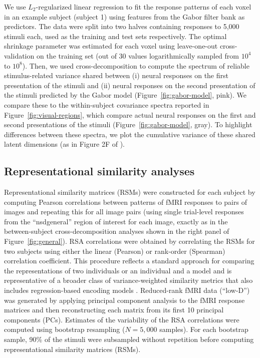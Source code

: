 \documentclass[10pt]{article}
\begin{document}
We use \(L_2\)-regularized linear regression to fit the response patterns of each voxel in an example subject (subject 1) using features from the Gabor filter bank as predictors. The data were split into two halves containing responses to 5,000 stimuli each, used as the training and test sets respectively. The optimal shrinkage parameter was estimated for each voxel using leave-one-out cross-validation on the training set (out of 30 values logarithmically sampled from \(10^4\) to \(10^8\)). Then, we used cross-decomposition to compute the spectrum of reliable stimulus-related variance shared between (i) neural responses on the first presentation of the stimuli and (ii) neural responses on the second presentation of the stimuli predicted by the Gabor model (Figure~\ref{fig:gabor-model}, pink). We compare these to the within-subject covariance spectra reported in Figure~\ref{fig:visual-regions}, which compare actual neural responses on the first and second presentations of the stimuli (Figure~\ref{fig:gabor-model}, gray). To highlight differences between these spectra, we plot the cumulative variance of these shared latent dimensions (as in Figure 2F of \textcite{Stringer2019}).

\subsection{Representational similarity analyses}\label{representational-similarity-analyses}

Representational similarity matrices (RSMs) were constructed for each subject by computing Pearson correlations between patterns of fMRI responses to pairs of images and repeating this for all image pairs (using single trial-level responses from the ``nsdgeneral'' region of interest for each image, exactly as in the between-subject cross-decomposition analyses shown in the right panel of Figure~\ref{fig:general}). RSA correlations were obtained by correlating the RSMs for two subjects using either the linear (Pearson) or rank-order (Spearman) correlation coefficient. This procedure reflects a standard approach for comparing the representations of two individuals or an individual and a model and is representative of a broader class of variance-weighted similarity metrics that also includes regression-based encoding models \autocite{Kriegeskorte2019,Kornblith2019}. Reduced-rank fMRI data (``low-D'') was generated by applying principal component analysis to the fMRI response matrices and then reconstructing each matrix from its first 10 principal components (PCs). Estimates of the variability of the RSA correlations were computed using bootstrap resampling (\(N = 5,000\) samples). For each bootstrap sample, 90\% of the stimuli were subsampled without repetition before computing representational similarity matrices (RSMs).
\end{document}
